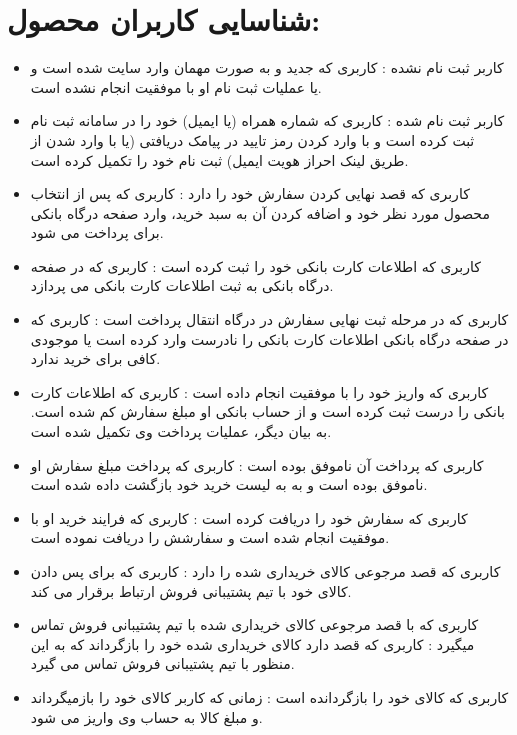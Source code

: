 \documentclass[14pt]{article}
\begin{document}
 
\section{شناسایی کاربران محصول:}

\begin{flushright}
\begin{itemize}

\item کاربر ثبت نام نشده : کاربری که جدید و به صورت مهمان وارد سایت شده است و یا عملیات ثبت نام او با موفقیت انجام نشده است.
\item کاربر ثبت نام شده : کاربری که شماره همراه (یا ایمیل) خود را در سامانه ثبت نام ثبت کرده است و با وارد کردن رمز تایید در پیامک دریافتی (یا با وارد شدن از طریق لینک احراز هویت ایمیل) ثبت نام خود را تکمیل کرده است.
\item کاربری که قصد نهایی کردن سفارش خود را دارد : کاربری که پس از انتخاب محصول مورد نظر خود و اضافه کردن آن به سبد خرید، وارد صفحه درگاه بانکی برای پرداخت می شود.
\item کاربری که اطلاعات کارت بانکی خود را ثبت کرده است : کاربری که در صفحه درگاه بانکی به ثبت اطلاعات کارت بانکی می پردازد.
\item کاربری که در مرحله ثبت نهایی سفارش در درگاه انتقال پرداخت است : کاربری که در صفحه درگاه بانکی اطلاعات کارت بانکی را نادرست وارد کرده است یا موجودی کافی برای خرید ندارد.
\item کاربری که واریز خود را با موفقیت انجام داده است :  کاربری که اطلاعات کارت بانکی را درست ثبت کرده است و از حساب بانکی او مبلغ سفارش کم شده است. به بیان دیگر، عملیات پرداخت وی تکمیل شده است. 
\item کاربری که پرداخت آن ناموفق بوده است : کاربری که پرداخت مبلغ سفارش او ناموفق بوده است و به به لیست خرید خود بازگشت داده شده است.
\item کاربری که سفارش خود را دریافت کرده است : کاربری که فرایند خرید او با موفقیت انجام شده است و سفارشش را دریافت نموده است.
\item کاربری که قصد مرجوعی کالای خریداری شده را دارد : کاربری که برای پس دادن کالای خود با تیم پشتیبانی فروش ارتباط برقرار می کند.
\item کاربری که با قصد مرجوعی کالای خریداری شده با تیم پشتیبانی فروش تماس میگیرد : کاربری که قصد دارد کالای خریداری شده خود را بازگرداند که به این منظور با تیم پشتیبانی فروش تماس می گیرد.
\item کاربری که کالای خود را بازگردانده است : زمانی که کاربر کالای خود را بازمیگرداند و مبلغ کالا به حساب وی واریز می شود.

\end{itemize}
\end{flushright}
\end{document}
